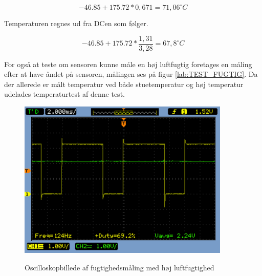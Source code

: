 \begin{equation}
-46.85+175.72*0,671=71,06^{\circ}C
\end{equation}

Temperaturen regnes ud fra DCen som følger. 

\begin{equation}
-46.85+175.72*\frac{1,31}{3,28}=67,8^{\circ}C
\end{equation}

For også at teste om sensoren kunne måle en høj luftfugtig foretages en måling efter at have åndet på sensoren, målingen ses på figur \ref{lab:TEST_FUGTIG}. Da der allerede er målt temperatur ved både stuetemperatur og høj temperatur udelades temperaturtest af denne test. 

\begin{figure}[H]
\centering
{\includegraphics[width=0.90\textwidth]{filer/modultest/Billeder/SCOP_humidFUGTIG}}
\caption{Oscilloskopbillede af fugtighedsmåling med høj luftfugtighed}
\label{lab:SCOP_FUGT_FUGTIG}
\end{figure}

